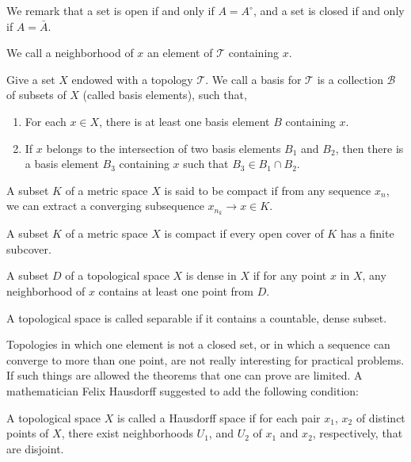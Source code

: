 We remark that a set is open if and only if $A=A^{\circ}$, and a set is closed if and only if $A=\bar{A}$.  


We call a neighborhood of $x$ an element of $\mathcal{T}$ containing $x$.
\begin{definition}
	Give a set $X$ endowed with a topology $\mathcal T$. We call a basis for $\mathcal{T}$ is a collection $\mathcal{B}$ of subsets of $X$ (called basis elements), such that,
	\begin{enumerate}
		\item  For each $x\in X$, there is at least one basis element $B$ containing $x$. 
		\item  If $x$ belongs to the intersection of two basis elements $B_1$ and $B_2$, then there is a basis element $B_3$ containing $x$ such that $B_3 \in B_1 \cap B_2$. 
	\end{enumerate}
\end{definition}

\begin{definition}
	A subset $K$ of a metric space $X$ is said to be compact if from any sequence $x_n$, we can extract a converging subsequence $x_{n_k} \rightarrow x \in K$.
\end{definition}

\begin{definition}[Compactness]
	A subset $K$ of a metric space $X$ is compact if every open cover of $K$ has a finite subcover. 
\end{definition}

\begin{definition}
	A subset $D$ of a topological space $X$ is dense in $X$ if for any point $x$ in $X$, any neighborhood of $x$ contains at least one point from $D$.
\end{definition}

\begin{definition}
	A topological space is called separable if it contains a countable, dense subset.
\end{definition}

Topologies in which one element is not a closed set, or in which a sequence can converge to more than one point, are not really interesting for practical problems. If such things are allowed the theorems that one can prove are limited. A mathematician Felix Hausdorff suggested to add the following condition:
  
\begin{definition}
A topological space $X$ is called a Hausdorff space if for each pair $x_1$, $x_2$ of distinct points of $X$, there exist neighborhoods $U_1$, and $U_2$ of $x_1$ and $x_2$, respectively, that are disjoint. 
\end{definition}

